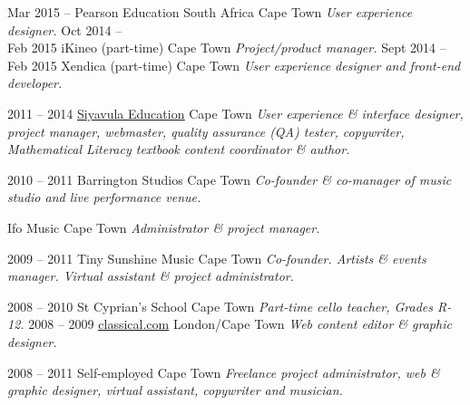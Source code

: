 \documentclass[]{friggeri-cv} %
\begin{document}
\begin{entrylist}
\entry
{Mar 2015 -- }
{Pearson Education South Africa}
{Cape Town}
{\emph{User experience designer.}}
\entry
{Oct 2014 -- \\ Feb 2015}
{iKineo (part-time)}
{Cape Town}
{\emph{Project/product manager.}}
\entry
{Sept 2014 -- \\Feb 2015}
{Xendica (part-time)}
{Cape Town}
{\emph{User experience designer and front-end developer.}}

\entry
{2011 -- 2014}
{\href{http://www.siyavula.com}{\underline{Siyavula Education}}}
{Cape Town}
{\emph{User experience \& interface designer, project manager, webmaster, quality assurance (QA) tester, copywriter, Mathematical Literacy textbook content coordinator \& author.}}

\entry
{2010 -- 2011}
{Barrington Studios}
{Cape Town}
{\emph{Co-founder \& co-manager of music studio and live performance venue.}}



\entry
{}
{Ifo Music}
{Cape Town}
{\emph{Administrator \& project manager.}}

\entry
{2009 -- 2011}
{Tiny Sunshine Music}
{Cape Town}
{\emph{Co-founder. Artists \& events manager. Virtual assistant \& project administrator.}}


\entry
{2008 -- 2010}
{St Cyprian's School}
{Cape Town}
{\emph{Part-time cello teacher, Grades R-12.}}
\entry
{2008 -- 2009}
{\href{http://www.classical.com}{\underline{classical.com}}}
{London/Cape Town}
{\emph{Web content editor \& graphic designer.}}


\entry
{2008 -- 2011}
{Self-employed}
{Cape Town}
{\emph{Freelance project administrator, web \& graphic designer, virtual assistant, copywriter and musician.}}

\end{entrylist}
\pagebreak
\end{document}
